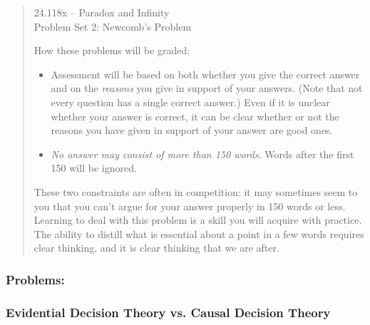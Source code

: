 \documentclass[12pt,a4paper]{article}
\begin{document}
\begin{quote}
\begin{center} {\large 24.118x -- Paradox and Infinity \\ \vspace{1mm}}
 {\large Problem Set 2: Newcomb's Problem \\ \vspace{1mm}}
 
 \end{center}
\vspace{3mm}

\noindent How these problems will be graded:
\begin{itemize} 

\item Assessment will be based on both whether you give the correct answer and on the \emph{reasons} you give in support of your answers. (Note that not every question has a single correct answer.) Even if it is unclear whether your answer is correct, it can be clear whether or not the reasons you have given in support of your answer are good ones. 

\item  \emph{No answer may consist of more than 150 words}. Words after the first 150 will be ignored.


\end{itemize} 

These two constraints are often in competition: it may sometimes seem to you that you can't argue for your answer properly in 150 words or less. Learning to deal with this problem is a skill you will acquire with practice. The ability to distill what is essential about a point in a few words requires clear thinking, and it is clear thinking that we are after.

\end{quote}

\subsubsection*{Problems:}
\subsubsection*{Evidential Decision Theory vs. Causal Decision Theory}
\end{document}
